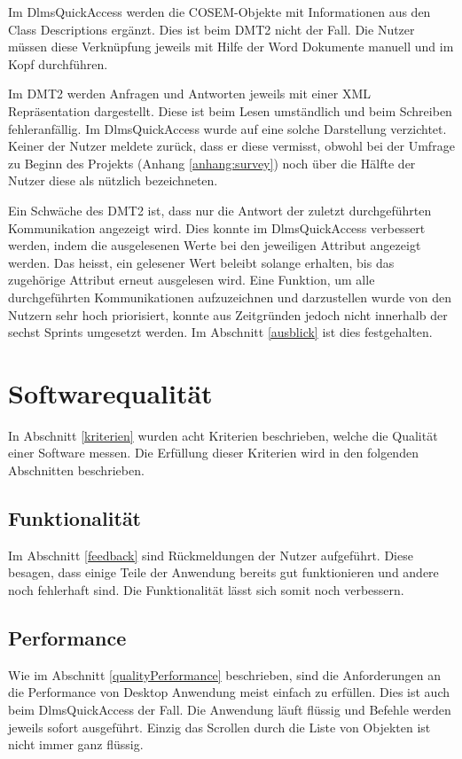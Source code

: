 Im DlmsQuickAccess werden die \ac{COSEM}-Objekte mit Informationen aus den Class Descriptions ergänzt.
Dies ist beim \ac{DMT2} nicht der Fall.
Die Nutzer müssen diese Verknüpfung jeweils mit Hilfe der Word Dokumente manuell und im Kopf durchführen.

Im \ac{DMT2} werden Anfragen und Antworten jeweils mit einer XML Repräsentation dargestellt.
Diese ist beim Lesen umständlich und beim Schreiben fehleranfällig.
Im DlmsQuickAccess wurde auf eine solche Darstellung verzichtet.
Keiner der Nutzer meldete zurück, dass er diese vermisst, obwohl bei der Umfrage zu Beginn des Projekts (Anhang \ref{anhang:survey}) noch über die Hälfte der Nutzer diese als nützlich bezeichneten.

Ein Schwäche des \ac{DMT2} ist, dass nur die Antwort der zuletzt durchgeführten Kommunikation angezeigt wird.
Dies konnte im DlmsQuickAccess verbessert werden, indem die ausgelesenen Werte bei den jeweiligen Attribut angezeigt werden.
Das heisst, ein gelesener Wert beleibt solange erhalten, bis das zugehörige Attribut erneut ausgelesen wird.
Eine Funktion, um alle durchgeführten Kommunikationen aufzuzeichnen und darzustellen wurde von den Nutzern sehr hoch priorisiert, konnte aus Zeitgründen jedoch nicht innerhalb der sechst Sprints umgesetzt werden.
Im Abschnitt \ref{ausblick} ist dies festgehalten.



\section{Softwarequalität}\label{evalQuality}
In Abschnitt \ref{kriterien} wurden acht Kriterien beschrieben, welche die Qualität einer Software messen.
Die Erfüllung dieser Kriterien wird in den folgenden Abschnitten beschrieben.

\subsection{Funktionalität}
Im Abschnitt \ref{feedback} sind Rückmeldungen der Nutzer aufgeführt.
Diese besagen, dass einige Teile der Anwendung bereits gut funktionieren und andere noch fehlerhaft sind.
Die Funktionalität lässt sich somit noch verbessern.

\subsection{Performance}
Wie im Abschnitt \ref{qualityPerformance} beschrieben, sind die Anforderungen an die Performance von Desktop Anwendung meist einfach zu erfüllen.
Dies ist auch beim DlmsQuickAccess der Fall.
Die Anwendung läuft flüssig und Befehle werden jeweils sofort ausgeführt.
Einzig das Scrollen durch die Liste von Objekten ist nicht immer ganz flüssig.

